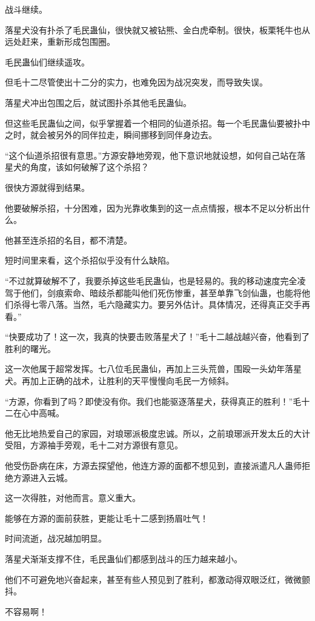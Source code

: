 \begin{this_body}
战斗继续。

落星犬没有扑杀了毛民蛊仙，很快就又被钻熊、金白虎牵制。很快，板栗牦牛也从远处赶来，重新形成包围圈。

毛民蛊仙们继续遥攻。

但毛十二尽管使出十二分的实力，也难免因为战况突发，而导致失误。

落星犬冲出包围之后，就试图扑杀其他毛民蛊仙。

但这些毛民蛊仙之间，似乎掌握着一个相同的仙道杀招。每一个毛民蛊仙要被扑中之时，就会被另外的同伴拉走，瞬间挪移到同伴身边去。

“这个仙道杀招很有意思。”方源安静地旁观，他下意识地就设想，如何自己站在落星犬的角度，该如何破解了这个杀招？

很快方源就得到结果。

他要破解杀招，十分困难，因为光靠收集到的这一点点情报，根本不足以分析出什么。

他甚至连杀招的名目，都不清楚。

短时间里来看，这个杀招似乎没有什么缺陷。

“不过就算破解不了，我要杀掉这些毛民蛊仙，也是轻易的。我的移动速度完全凌驾于他们，剑痕索命、暗歧杀都能叫他们死伤惨重，甚至单靠飞剑仙蛊，也能将他们杀得七零八落。当然，毛六隐藏实力。要另外估计。具体情况，还得真正交手再看。”

“快要成功了！这一次，我真的快要击败落星犬了！”毛十二越战越兴奋，他看到了胜利的曙光。

这一次他属于超常发挥。七八位毛民蛊仙，再加上三头荒兽，围殴一头幼年落星犬。再加上正确的战术，让胜利的天平慢慢向毛民一方倾斜。

“方源，你看到了吗？即使没有你。我们也能驱逐落星犬，获得真正的胜利！”毛十二在心中高喊。

他无比地热爱自己的家园，对琅琊派极度忠诚。所以，之前琅琊派开发太丘的大计受阻，方源袖手旁观，毛十二对方源很有意见。

他受伤卧病在床，方源去探望他，他连方源的面都不想见到，直接派遣凡人蛊师拒绝方源进入云城。

这一次得胜，对他而言。意义重大。

能够在方源的面前获胜，更能让毛十二感到扬眉吐气！

时间流逝，战况越加明显。

落星犬渐渐支撑不住，毛民蛊仙们都感到战斗的压力越来越小。

他们不可避免地兴奋起来，甚至有些人预见到了胜利，都激动得双眼泛红，微微颤抖。

不容易啊！


\end{this_body}
